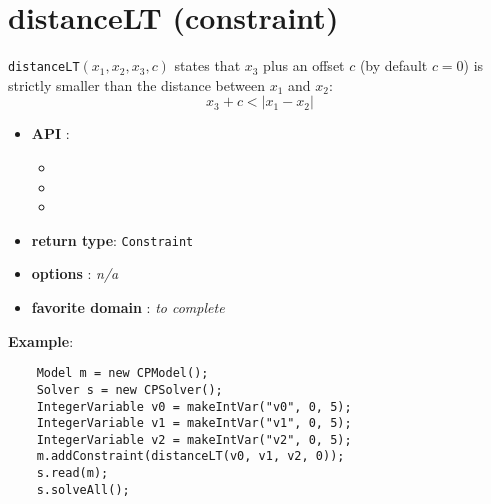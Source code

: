 \label{distancelt}
\hypertarget{distancelt}{}

\section{distanceLT (constraint)}\label{distancelt:distanceltconstraint}\hypertarget{distancelt:distanceltconstraint}{}
\begin{notedef}
  \texttt{distanceLT}$(x_1,x_2,x_3,c)$ states that $x_3$ plus an offset $c$ (by default $c=0$) is strictly smaller than the distance between $x_1$ and $x_2$:
$$ x_3 + c < | x_1 - x_2 |$$
\end{notedef}

\begin{itemize}
	\item \textbf{API} :
	\begin{itemize}
		\item {}
		\item {}
		\item {}
	\end{itemize}
	\item \textbf{return type}: \texttt{Constraint}
	\item \textbf{options} : \emph{n/a}
	\item \textbf{favorite domain} : \emph{to complete}
\end{itemize}

\textbf{Example}:
\begin{lstlisting}
	Model m = new CPModel();
	Solver s = new CPSolver();
	IntegerVariable v0 = makeIntVar("v0", 0, 5);
	IntegerVariable v1 = makeIntVar("v1", 0, 5);
	IntegerVariable v2 = makeIntVar("v2", 0, 5);
	m.addConstraint(distanceLT(v0, v1, v2, 0));
	s.read(m);
	s.solveAll();
\end{lstlisting}
